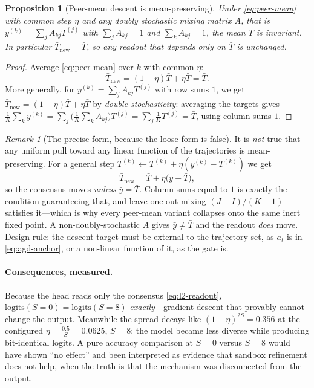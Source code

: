 \documentclass[11pt,a4paper]{article}
\newcommand{\etadim}{\eta}
\theoremstyle{plain}
\newtheorem{proposition}{Proposition}
\theoremstyle{definition}
\theoremstyle{remark}
\newtheorem{remark}{Remark}
\begin{document}
\begin{proposition}[Peer-mean descent is mean-preserving]
\label{prop:peer-inert}
Under \eqref{eq:peer-mean} with common step $\etadim$ and \emph{any}
doubly stochastic mixing matrix $A$, that is
$y^{(k)} = \sum_j A_{kj}T^{(j)}$ with $\sum_j A_{kj} = 1$ and $\sum_k A_{kj} = 1$, the mean
$\bar T$ is invariant. In particular $\bar T_{\text{new}} = \bar T$, so any
readout that depends only on $\bar T$ is unchanged.
\end{proposition}
\begin{proof}
Average \eqref{eq:peer-mean} over $k$ with common $\etadim$:
\begin{equation}
  \bar T_{\text{new}} = (1-\etadim)\bar T + \etadim \bar T = \bar T .
  \label{eq:peer-inv}
\end{equation}
More generally, for $y^{(k)} = \sum_j A_{kj}T^{(j)}$ with row sums $1$, we get
$\bar T_{\text{new}} = (1-\etadim)\bar T + \etadim \bar T$ by
\emph{double stochasticity}: averaging the targets gives
$\frac{1}{K}\sum_k y^{(k)} = \sum_j \bigl(\frac{1}{K}\sum_k A_{kj}\bigr) T^{(j)} = \sum_j \frac{1}{K}T^{(j)} = \bar T$, using column sums $1$.
\end{proof}

\noindent
\begin{remark}[The precise form, because the loose form is false]
It is \emph{not} true that any uniform pull toward any linear function of the
trajectories is mean-preserving. For a general step
$T^{(k)} \leftarrow T^{(k)} + \etadim (y^{(k)} - T^{(k)})$ we get
\begin{equation}
  \bar T_{\text{new}} = \bar T + \etadim\bigl(\bar y - \bar T\bigr),
  \label{eq:general-step}
\end{equation}
so the consensus moves \emph{unless} $\bar y = \bar T$. Column sums equal to
$1$ is exactly the condition guaranteeing that, and leave-one-out mixing
$(J-I)/(K-1)$ satisfies it---which is why every peer-mean variant collapses
onto the same inert fixed point. A non-doubly-stochastic $A$ gives
$\bar y \neq \bar T$ and the readout \emph{does} move. Design rule: the descent
target must be external to the trajectory set, as $a_t$ is in
\eqref{eq:agd-anchor}, or a non-linear function of it, as the gate is.
\end{remark}

\paragraph{Consequences, measured.}
Because the head reads only the consensus \eqref{eq:l2-readout},
$\mathrm{logits}(S{=}0) = \mathrm{logits}(S{=}8)$ \emph{exactly}---gradient
descent that provably cannot change the output. Meanwhile the spread decays
like $(1-\etadim)^{2S} = 0.356$ at the configured
$\etadim = \tfrac{0.5}{S} = 0.0625$, $S = 8$: the model
became less diverse while producing bit-identical logits. A pure accuracy
comparison at $S = 0$ versus $S = 8$ would have shown ``no effect'' and been
interpreted as evidence that sandbox refinement does not help, when the truth
is that the mechanism was disconnected from the output.
\end{document}
